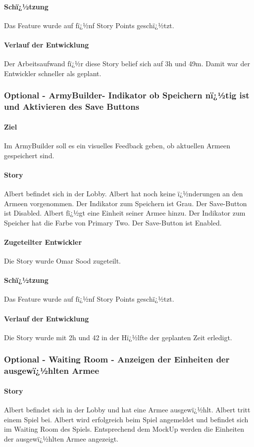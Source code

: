 \documentclass[12pt, titlepage]{scrartcl}
\begin{document}
			\paragraph{Schï¿½tzung}
			Das Feature wurde auf fï¿½nf Story Points geschï¿½tzt.
			\paragraph{Verlauf der Entwicklung} 
			Der Arbeitsaufwand fï¿½r diese Story belief sich auf 3h und 49m. Damit war der Entwickler schneller als geplant.
			\subsubsection{Optional - ArmyBuilder- Indikator ob Speichern nï¿½tig ist und Aktivieren des Save Buttons}
			\paragraph{Ziel} Im ArmyBuilder soll es ein visuelles Feedback geben, ob aktuellen Armeen gespeichert sind.
			\paragraph{Story} Albert befindet sich in der Lobby. Albert hat noch keine ï¿½nderungen an den Armeen vorgenommen. Der Indikator zum Speichern ist Grau. Der Save-Button ist Disabled. Albert fï¿½gt eine Einheit seiner Armee hinzu. Der Indikator zum Speicher hat die Farbe von Primary Two. Der Save-Button ist Enabled.
			\paragraph{Zugeteilter Entwickler} Die Story wurde Omar Sood zugeteilt.
			\paragraph{Schï¿½tzung}
			Das Feature wurde auf fï¿½nf Story Points geschï¿½tzt.
			\paragraph{Verlauf der Entwicklung} 
			Die Story wurde mit 2h und 42 in der Hï¿½lfte der geplanten Zeit erledigt.
			\subsubsection{Optional - Waiting Room - Anzeigen der Einheiten der ausgewï¿½hlten Armee}
			\paragraph{Story} Albert befindet sich in der Lobby und hat eine Armee ausgewï¿½hlt. Albert tritt einem Spiel bei. Albert wird erfolgreich beim Spiel angemeldet und befindet sich im Waiting Room des Spiels. Entsprechend dem MockUp werden die Einheiten der ausgewï¿½hlten Armee angezeigt.
\end{document}
